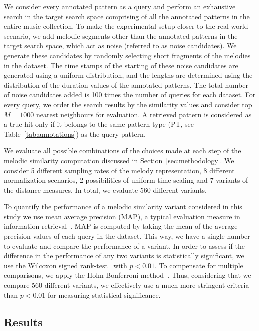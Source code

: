 We consider every annotated pattern as a query and perform an exhaustive search in the target search space comprising of all the annotated patterns in the entire music collection. To make the experimental setup closer to the real world scenario, we add melodic segments other than the annotated patterns in the target search space, which act as noise (referred to as noise candidates). We generate these candidates by randomly selecting short fragments of the melodies in the dataset. The time stamps of the starting of these noise candidates are generated using a uniform distribution, and the lengths are determined using the distribution of the duration values of the annotated patterns. The total number of noise candidates added is 100 times the number of queries for each dataset. For every query, we order the search results by the similarity values and consider top $M=1000$ nearest neighbours for evaluation. A retrieved pattern is considered as a true hit only if it belongs to the same pattern type (PT, see Table~\ref{tab:annotations}) as the query pattern. 

We evaluate all possible combinations of the choices made at each step of the melodic similarity computation discussed in Section~\ref{sec:methodology}. We consider 5 different sampling rates of the melody representation, 8 different normalization scenarios, 2 possibilities of uniform time-scaling and 7 variants of the distance measures. In total, we evaluate 560 different variants.

To quantify the performance of a melodic similarity variant considered in this study we use mean average precision (MAP), a typical evaluation measure in information retrieval~\cite{manning2008introduction}. MAP is computed by taking the mean of the average precision values of each query in the dataset. This way, we have a single number to evaluate and compare the performance of a variant. In order to assess if the difference in the performance of any two variants is statistically significant, we use the Wilcoxon signed rank-test~\cite{wilcoxon1945individual} with $p < 0.01$. To compensate for multiple comparisons, we apply the Holm-Bonferroni method~\cite{holm1979simple}. Thus, considering that we compare 560 different variants, we effectively use a much more stringent criteria than $p < 0.01$ for measuring statistical significance.


\subsection{Results}



